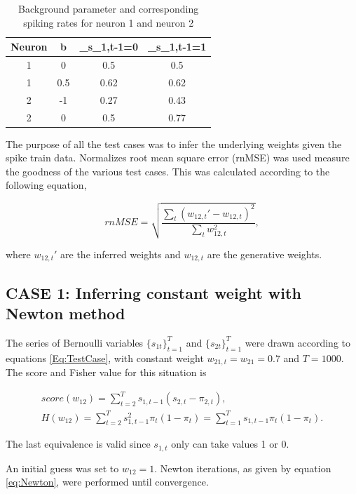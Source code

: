 \begin{table}[!h]
\centering
\begin{tabular}{|c|c|c|c|}
	\hline
	Neuron & b & \pi_{s_{1,t-1}=0} & \pi_{s_{1,t-1}=1} \\
	\hline\hline
	1 & 0 & 0.5 & 0.5\\
	\hline
	1 & 0.5 & 0.62 & 0.62\\
	\hline
	2 & -1  & 0.27 & 0.43\\
	\hline
	2 & 0  & 0.5 & 0.77\\
	\hline
\end{tabular}
\caption{Background parameter and corresponding spiking rates for neuron 1 and neuron 2}
\label{table:parameters}
\end{table}

The purpose of all the test cases was to infer the underlying weights given the spike train data. Normalizes root mean square error (rnMSE) was used measure the goodness of the various test cases. This was calculated according to the following equation,

\begin{equation}
    rnMSE = \sqrt{\frac{\sum_t(w_{12,t}'-w_{12,t})^2}{\sum_t w_{12,t}^2}},
\end{equation}

where $w_{12,t}'$  are the inferred weights and $w_{12,t}$ are the generative weights.

\subsection{CASE 1: Inferring constant weight with Newton method}

The series of Bernoulli variables $\{s_{1t}\}_{t=1}^T$ and $\{s_{2t}\}_{t=1}^T$ were drawn according to equations \ref{Eq:TestCase}, with constant weight $w_{21,t} = w_{21} = 0.7$ and $T=1000$. The score and Fisher value for this situation is 

\begin{equation}
\begin{split}
    score(w_{12}) = \sum_{t=2}^{T} s_{1, t-1} (s_{2,t}-\pi_{2,t}), \\
    H(w_{12}) = \sum_{t=2}^T s_{1, t-1}^2 \pi_t(1-\pi_t) = \sum_{t=1}^T s_{1, t-1} \pi_t(1-\pi_t).
\end{split}
\end{equation}

The last equivalence is valid since $s_{1,t}$ only can take values 1 or 0. 

An initial guess was set to $w_{12} = 1$. Newton iterations, as given by equation \ref{eq:Newton}, were performed until convergence.\\ 

